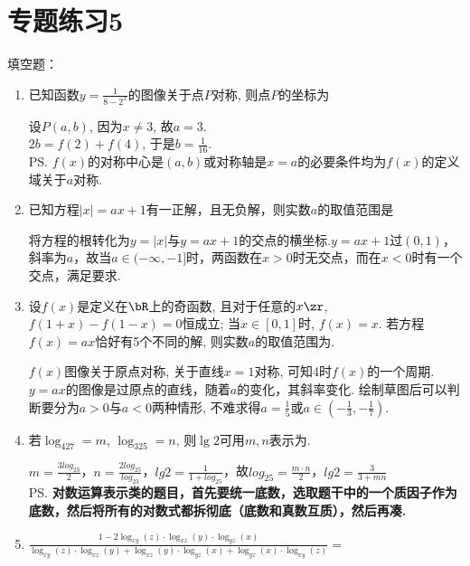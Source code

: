 \chapter*{专题练习5}
填空题：
\begin{enumerate}
    \item 已知函数$y=\frac{1}{8-2^x}$的图像关于点$P$对称, 则点$P$的坐标为
    \begin{jieda}
    设$P(a,b)$, 因为$x\neq 3$, 故$a = 3$. \\
    $2b=f(2)+f(4)$, 于是$b=\frac{1}{16}$. \\
    \ps $f(x)$的对称中心是$(a, b)$或对称轴是$x = a$的必要条件均为$f(x)$的定义域关于$a$对称.
    \end{jieda}
    \item 已知方程$|x| = ax+1$有一正解，且无负解，则实数$a$的取值范围是\blkda{$(-\infty, -1]$ }
    \begin{jieda}
        将方程的根转化为$y = |x|$与$y = ax+1$的交点的横坐标.$y = ax+1$过$(0, 1)$，斜率为$a$，故当$a \in (-\infty, -1]$时，两函数在$x > 0$时无交点，而在$x < 0$时有一个交点，满足要求.
    \end{jieda}
    \item 设$f(x)$是定义在$\bR$上的奇函数, 且对于任意的$x\zr$, $f(1+x)-f(1-x)=0$恒成立; 当$x\in[0,1]$时, $f(x)=x$. 
    若方程$f(x)=ax$恰好有5个不同的解, 则实数$a$的取值范围为. 
    \begin{jieda}
    $f(x)$图像关于原点对称, 关于直线$x=1$对称, 可知4时$f(x)$的一个周期. \\
    $y = ax$的图像是过原点的直线，随着$a$的变化，其斜率变化. 绘制草图后可以判断要分为$a>0$与$a<0$两种情形, 
    不难求得$a=\frac{1}{5}$或$a\in(-\frac{1}{3},-\frac{1}{7})$. 
    \end{jieda}
    \item 若$\log_427=m$, $\log_325=n$, 则$\lg2$可用$m,n$表示为. 
    \begin{jieda}
        $m = \frac{3log_23}{2}$，$n = \frac{2log_25}{log_23}$，$lg2 = \frac{1}{1+log_25}$，故$log_25 = \frac{m\cdot n}{2}$，$lg2 = \frac{3}{3+mn}$ \\
        \ps \textbf{对数运算表示类的题目，首先要统一底数，选取题干中的一个质因子作为底数，然后将所有的对数式都拆彻底（底数和真数互质），然后再凑.}
    \end{jieda}
    \item $\frac{1-2\log_{xy}\left(z\right)\cdot\log_{xz}\left(y\right)\cdot\log_{yz}\left(x\right)}{\log_{xy}\left(z\right)\cdot\log_{xz}\left(y\right)+\log_{xz}\left(y\right)\cdot\log_{yz}\left(x\right)+\log_{yz}\left(x\right)\cdot\log_{xy}\left(z\right)} = $

\end{enumerate}
